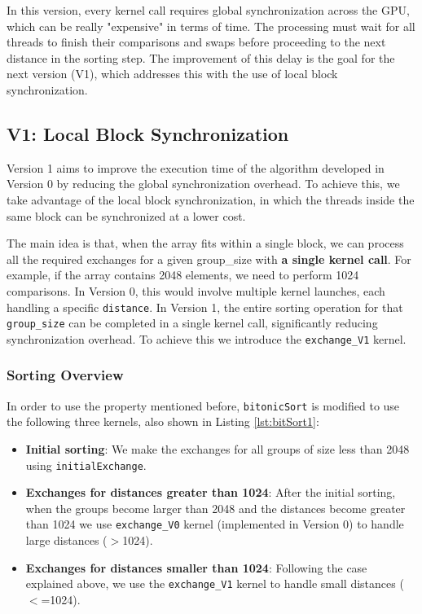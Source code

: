 \documentclass[a4paper,12pt]{article}
\begin{document}
In this version, every kernel call requires global synchronization across the GPU, which can be really "expensive" in terms of time. The processing must wait for all threads to finish their comparisons and swaps before proceeding to the next distance in the sorting step. The improvement of this delay is the goal for the next version (V1), which addresses this with the use of local block synchronization.

\subsection{V1: Local Block Synchronization}

Version 1 aims to improve the execution time of the algorithm developed in Version 0 by reducing the global synchronization overhead. To achieve this, we take advantage of the local block synchronization, in which the threads inside the same block can be synchronized at a lower cost. 

The main idea is that, when the array fits within a single block, we can process all the required exchanges for a given group\_size with \textbf{a single kernel call}. For example, if the array contains 2048 elements, we need to perform 1024 comparisons. In Version 0, this would involve multiple kernel launches, each handling a specific \texttt{distance}. In Version 1, the entire sorting operation for that \texttt{group\_size} can be completed in a single kernel call, significantly reducing synchronization overhead. To achieve this we introduce the \texttt{exchange\_V1} kernel. 

\subsubsection*{Sorting Overview}
In order to use the property mentioned before, \texttt{bitonicSort} is modified to use the following three kernels, also shown in Listing \ref{lst:bitSort1}:

\begin{itemize}
    \item \textbf{Initial sorting}: We make the exchanges for all groups of size less than 2048 using \texttt{initialExchange}. 
    \item \textbf{Exchanges for distances greater than 1024}: After the initial sorting, when the groups become larger than 2048 and the distances become greater than 1024 we use \texttt{exchange\_V0} kernel (implemented in Version 0) to handle large distances ($>$1024).
    \item \textbf{Exchanges for distances smaller than 1024}: Following the case explained above, we use the \texttt{exchange\_V1} kernel to handle small distances ($<$=1024).
    
\end{itemize}
\end{document}
